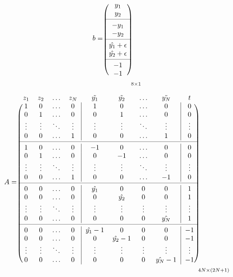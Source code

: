 \documentclass[a4paper]{article}
\begin{document}
\[
b = \begin{blockarray}{c}
\\
\begin{block}{(c)}
y_1 \\
y_2 \\
\cmidrule{1-1}
-y_1 \\
-y_2 \\
\cmidrule{1-1}
\hat{y_1} + \epsilon \\
\hat{y_2} + \epsilon \\
\cmidrule{1-1}
-1 \\
-1 \\
\end{block}
\end{blockarray}_{8\times1}
\]


\pagebreak


\[
A = \begin{blockarray}{ccccccccc}
z_1 & z_2 & \dots & z_N & \tilde{y_1} & \tilde{y_2} & \dots & \tilde{y_N} & t \\
\begin{block}{(cccc|cccc|c)}
1 & 0 & \dots & 0 & 1 & 0 & \dots & 0 & 0 \\
0 & 1 & \dots & 0 & 0 & 1 & \dots & 0 & 0\\
\vdots & \vdots & \ddots & \vdots & \vdots & \vdots & \ddots & \vdots & \vdots\\
0 & 0 & \dots & 1 & 0 & 0 & \dots & 1 & 0\\
\cmidrule{1-9}
1 & 0 & \dots & 0 & -1 & 0 & \dots & 0 & 0 \\
0 & 1 & \dots & 0 & 0 & -1 & \dots & 0 & 0\\
\vdots & \vdots & \ddots & \vdots & \vdots & \vdots & \ddots & \vdots & \vdots\\
0 & 0 & \dots & 1 & 0 & 0 & \dots & -1 & 0\\
\cmidrule{1-9}
0 & 0 & \dots & 0 & \hat{y_1} & 0 & 0 & 0 & 1 \\
0 & 0 & \dots & 0 & 0 & \hat{y_2} & 0 & 0 & 1\\
\vdots & \vdots & \ddots & \vdots & \vdots & \vdots & \vdots & \vdots & \vdots\\
0 & 0 & \dots & 0 & 0 & 0 & 0 & \hat{y_N} & 1\\
\cmidrule{1-9}
0 & 0 & \dots & 0 & \hat{y_1}-1 & 0 & 0 & 0 & -1 \\
0 & 0 & \dots & 0 & 0 & \hat{y_2}-1 & 0 & 0 & -1\\
\vdots & \vdots & \ddots & \vdots & \vdots & \vdots & \vdots & \vdots & \vdots\\
0 & 0 & \dots & 0 & 0 & 0 & 0 & \hat{y_N}-1 & -1\\
\end{block}
\end{blockarray}_{4N\times (2N+1)}
\]
\end{document}
